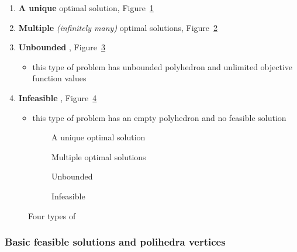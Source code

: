 \documentclass[english]{article}
\begin{document}
\begin{enumerate}
  \item \textbf{A unique} optimal solution, Figure~\ref{subfig:unique-solution}
  \item \textbf{Multiple} \textit{(infinitely many)} optimal solutions, Figure~\ref{subfig:multiple-solutions}
  \item \textbf{Unbounded} \LP, Figure~\ref{subfig:unbounded-lp}
        \begin{itemize}
          \item this type of problem has unbounded polyhedron and unlimited objective function values
        \end{itemize}
  \item \textbf{Infeasible} \LP, Figure~\ref{subfig:infeasible-lp}
        \begin{itemize}
          \item this type of problem has an empty polyhedron and no feasible solution
        \end{itemize}
\end{enumerate}

\begin{figure}[htbp]
  \bigskip
  \centering
  \begin{subfigure}[b]{0.495\textwidth}
    \bigskip
    \centering
    \caption{A unique optimal solution}
    \label{subfig:unique-solution}
    \bigskip
  \end{subfigure}
  \begin{subfigure}[b]{0.495\textwidth}
    \bigskip
    \centering
    \caption{Multiple optimal solutions}
    \label{subfig:multiple-solutions}
    \bigskip
  \end{subfigure}
  \bigskip
  \begin{subfigure}[b]{0.495\textwidth}
    \bigskip
    \centering
    \caption{Unbounded \LP}
    \label{subfig:unbounded-lp}
    \bigskip
  \end{subfigure}
  \begin{subfigure}[b]{0.495\textwidth}
    \bigskip
    \centering
    \caption{Infeasible \LP}
    \label{subfig:infeasible-lp}
    \bigskip
  \end{subfigure}
  \caption{Four types of \LP}
  \label{fig:lp-types}
  \bigskip
\end{figure}

\subsubsection{Basic feasible solutions and polihedra vertices}
\end{document}
